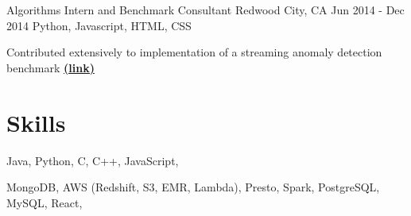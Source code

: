 \documentclass[letterpaper]{simjega-resume}
\begin{document}
{Algorithms Intern and Benchmark Consultant}
{Redwood City, CA}
{Jun 2014 - Dec 2014}
{Python, Javascript, HTML, CSS}
{\begin{tightitemize}
\item[] Contributed extensively to implementation of a streaming anomaly detection benchmark
\href{https://github.com/Numenta/NAB}{\bf (link)}
\end{tightitemize}}






\section{Skills}
\jgsectionline
{}
{
Java,
Python,
C,
C++,
JavaScript,
}

{
MongoDB,
AWS (Redshift, S3, EMR, Lambda),
Presto,
Spark,
PostgreSQL,
MySQL,
React,

}
\end{document}
